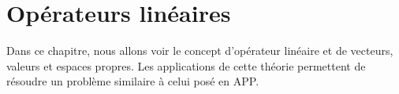 %	
%	
%	
%	
%	
%	
%	
%	
%	

\chapter{Opérateurs linéaires}

Dans ce chapitre, nous allons voir le concept d'opérateur linéaire et de vecteurs, valeurs et espaces propres. Les applications de cette théorie permettent de résoudre un problème similaire à celui posé en APP.

